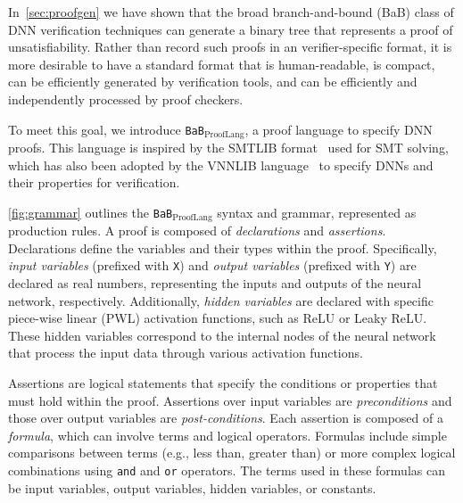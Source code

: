 \documentclass[oneside,11pt,dvipsnames]{book}
\newcommand{\functiontextformat}[1]{\textrm{\texttt{#1}}}
\newcommand{\prooflang}{\texttt{BaB$_{\text{ProofLang}}$}}
\begin{document}
In~\autoref{sec:proofgen} we have shown that the broad branch-and-bound (BaB) class of DNN verification techniques  can generate a binary tree that represents a proof of unsatisfiability.
Rather than record such proofs in an verifier-specific format, it is more desirable to have a standard format
that is human-readable, is compact, can be efficiently generated by verification tools, and can
be efficiently and independently processed by proof checkers.  

To meet this goal, we introduce \prooflang{}, a proof language to specify DNN proofs.
This language is inspired by the SMTLIB format~\cite{barrett2010smt} used for SMT solving, which has also been adopted by the  VNNLIB language~\cite{vnnlib} to specify DNNs and their properties for  verification.


\autoref{fig:grammar} outlines the \prooflang{} syntax and grammar, represented as production rules. 
A proof is composed of \textit{declarations} and \textit{assertions}. Declarations define the variables and their types within the proof. Specifically, \textit{input variables} (prefixed with \functiontextformat{X}) and \textit{output variables} (prefixed with \functiontextformat{Y}) are declared as real numbers, representing the inputs and outputs of the neural network, respectively. Additionally, \textit{hidden variables} are declared with specific piece-wise linear (PWL) activation functions, such as ReLU or Leaky ReLU. These hidden variables correspond to the internal nodes of the neural network that process the input data through various activation functions.

Assertions are logical statements that specify the conditions or properties that must hold within the proof. Assertions over input variables are \emph{preconditions} and those over output variables are \emph{post-conditions}. Each assertion is composed of a \textit{formula}, which can involve terms and logical operators. Formulas include simple comparisons between terms (e.g., less than, greater than) or more complex logical combinations using \functiontextformat{and} and \functiontextformat{or} operators. The terms used in these formulas can be input variables, output variables, hidden variables, or constants.
\end{document}
